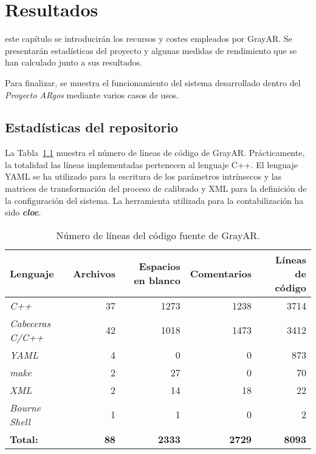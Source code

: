 \chapter{Resultados}
\label{chap:resultados}

 este capítulo se introducirán los recursos y costes empleados por GrayAR. Se presentarán estadísticas del proyecto y algunas medidas de rendimiento que se han calculado junto a sus
resultados. %

Para finalizar, se muestra el funcionamiento del sistema desarrollado dentro del \textit{Proyecto ARgos} mediante varios casos de usos.  

\section{Estadísticas del repositorio}
La Tabla~\ref{tab:number_of_lines} muestra el número de líneas de código de GrayAR. Prácticamente, la totalidad las líneas implementadas pertenecen al lenguaje C++. El lenguaje YAML se ha utilizado para la escritura de los parámetros intrínsecos y las matrices de transformación del proceso de calibrado y XML para la definición de la configuración del sistema. La herramienta utilizada para la contabilización ha sido \textbf{\textit{cloc}}.

\begin{table}[h]
  \centering
  \begin{tabular}{|l|r|r|r|r|}
    \hline
    \textbf{Lenguaje} & \textbf{Archivos} & \textbf{Espacios en blanco} & \textbf{Comentarios} & \textbf{Líneas de código} \\
    \hline
    \textit{C++} & 37 & 1273 & 1238 & 3714 \\
    \hline
    \textit{Cabeceras C/C++} & 42 & 1018 & 1473 & 3412 \\
    \hline
    \textit{YAML} & 4 & 0 & 0 & 873 \\
    \hline
    \textit{make} & 2 & 27 & 0 & 70 \\
    \hline
    \textit{XML} & 2 & 14 & 18 & 22 \\
    \hline
    \textit{Bourne Shell} & 1 & 1 & 0 & 2 \\
    \hline
    \textbf{Total:} & \textbf{88} & \textbf{2333} & \textbf{2729} & \textbf{8093} \\
    \hline
  \end{tabular}
  \caption{Número de líneas del código fuente de GrayAR.}
  \label{tab:number_of_lines}
\end{table}

